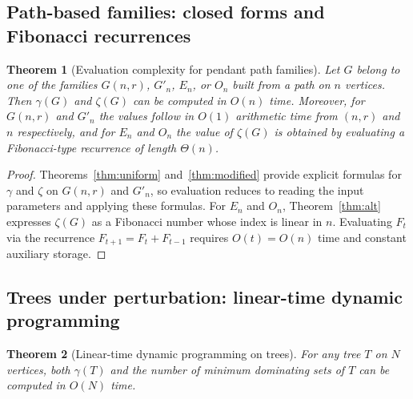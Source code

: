 \documentclass[11pt]{article}
\newtheorem{theorem}{Theorem}
\theoremstyle{definition}
\theoremstyle{remark}
\begin{document}
\subsection{Path-based families: closed forms and Fibonacci recurrences}

\begin{theorem}[Evaluation complexity for pendant path families]\label{thm:algo-path}
Let $G$ belong to one of the families $G(n,r)$, $G'_n$, $E_n$, or $O_n$ built from a path on $n$ vertices.
Then $\gamma(G)$ and $\zeta(G)$ can be computed in $O(n)$ time.
Moreover, for $G(n,r)$ and $G'_n$ the values follow in $O(1)$ arithmetic time from $(n,r)$ and $n$ respectively,
and for $E_n$ and $O_n$ the value of $\zeta(G)$ is obtained by evaluating a Fibonacci-type recurrence of
length $\Theta(n)$.
\end{theorem}

\begin{proof}
Theorems~\ref{thm:uniform} and~\ref{thm:modified} provide explicit formulas for $\gamma$ and $\zeta$
on $G(n,r)$ and $G'_n$, so evaluation reduces to reading the input parameters and applying these formulas.
For $E_n$ and $O_n$, Theorem~\ref{thm:alt} expresses $\zeta(G)$ as a Fibonacci number whose index is linear
in $n$.
Evaluating $F_t$ via the recurrence $F_{t+1}=F_t+F_{t-1}$ requires $O(t)=O(n)$ time and constant auxiliary
storage.
\end{proof}


\subsection{Trees under perturbation: linear-time dynamic programming}

\begin{theorem}[Linear-time dynamic programming on trees]\label{thm:tree-dp}
For any tree $T$ on $N$ vertices, both $\gamma(T)$ and the number of minimum dominating sets of $T$
can be computed in $O(N)$ time.
\end{theorem}
\end{document}

